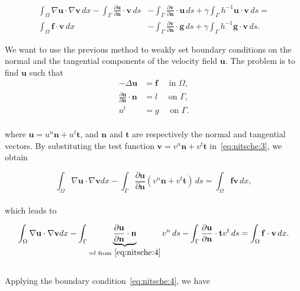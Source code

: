 \documentclass[11pt,a4paper,titlepage]{report}
\begin{document}
\begin{equation}
\begin{split}
\int_{\Omega} \nabla \mathbf{u} \cdot \nabla \mathbf{v} \, dx
- \int_{\Gamma} \frac{\partial \mathbf{u}}{\partial \mathbf{n}} \cdot \mathbf{v} \, ds
& - \int_{\Gamma} \frac{\partial \mathbf{v}}{\partial \mathbf{n}} \cdot \mathbf{u} \, ds 
+ \gamma \int_{\Gamma} h^{-1} \mathbf{u} \cdot \mathbf{v} \, ds = \\
	\int_{\Omega} \mathbf{f} \cdot \mathbf{v} \, dx
&- \int_{\Gamma} \frac{\partial \mathbf{v}}{\partial \mathbf{n}} \cdot \mathbf{g} \, ds
+ \gamma \int_{\Gamma} h^{-1} \mathbf{g} \cdot \mathbf{v} \, ds.
\end{split}
\end{equation}

We want to use the previous method to weakly set boundary conditions on the normal and the tangential components of the velocity field $\mathbf{u}$. The problem is to find $\mathbf{u}$ such that
\begin{align}
- \Delta \mathbf{u} &= \mathbf{f} \quad \text{ in } \Omega, \\
\label{eq:nitsche:4}
\frac{\partial \mathbf{u}}{\partial \mathbf{n}} \cdot \mathbf{n} &= l \quad \text{ on } \Gamma, \\ 
u^t &= g \quad \text{ on } \Gamma.
\end{align}
\\
where $\mathbf{u} = u^n \mathbf{n} + u^t \mathbf{t}$, and $\mathbf{n}$ and $\mathbf{t}$ are respectively the normal and tangential vectors. By substituting the test function $\mathbf{v} = v^n \mathbf{n} + v^t \mathbf{t}$ in~\eqref{eq:nitsche:3}, we obtain

\begin{equation}
\int_\Omega \nabla \mathbf{u} \cdot \nabla \mathbf{v} dx
- \int_{\Gamma} \frac{\partial \mathbf{u}}{\partial \mathbf{n}} (v^n \mathbf{n} + v^t \mathbf{t} ) \, ds
 = \int_\Omega \mathbf{fv} \, dx,
\end{equation}
\\
which leads to

\begin{equation}
\int_\Omega \nabla \mathbf{u} \cdot \nabla \mathbf{v} dx
- \int_{\Gamma}  \underbrace{ \frac{\partial \mathbf{u}}{\partial \mathbf{n}} \cdot \mathbf{n} }_{= l \text{ from} ~\eqref{eq:nitsche:4} }  v^n \, ds
- \int_{\Gamma} \frac{\partial \mathbf{u}}{\partial \mathbf{n}} \cdot \mathbf{t} v^t \, ds
= \int_\Omega \mathbf{f \cdot v} \, dx.
\end{equation}
\\
Applying the boundary condition~\eqref{eq:nitsche:4}, we have
\end{document}
